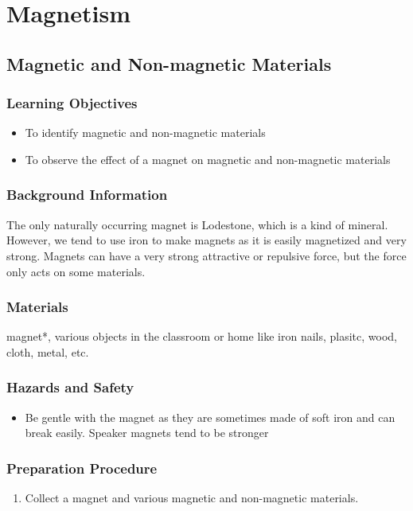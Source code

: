 \section{Magnetism}

\subsection{Magnetic and Non-magnetic Materials}

\subsubsection*{Learning Objectives}
\begin{itemize}
\item{To identify magnetic and non-magnetic materials} 
\item{To observe the effect of a magnet on magnetic and non-magnetic materials} 
\end{itemize}

\subsubsection*{Background Information}
The only naturally occurring magnet is Lodestone, which is a kind of mineral. However, we tend to use iron to make magnets as it is easily magnetized and very strong. Magnets can have a very strong attractive or repulsive force, but the force only acts on some materials.

\subsubsection*{Materials}
magnet*, various objects in the classroom or home like iron nails, plasitc, wood, cloth, metal, etc.  

\subsubsection*{Hazards and Safety}
\begin{itemize}
\item{Be gentle with the magnet as they are sometimes made of soft iron and can break easily.  Speaker magnets tend to be stronger}
\end{itemize}

\subsubsection*{Preparation Procedure}
\begin{enumerate}
\item{Collect a magnet and various magnetic and non-magnetic materials.} 
\end{enumerate}

